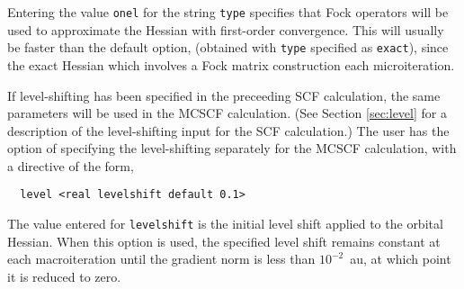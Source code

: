 Entering the value \verb+onel+ for the string \verb+type+ specifies
that Fock operators will be used to
approximate the Hessian with first-order convergence. This will usually
be faster than the default option, (obtained with \verb+type+ specified 
as \verb+exact+), since the exact Hessian which involves a Fock matrix
construction each microiteration. 

If level-shifting has been specified in the preceeding SCF calculation,
the same parameters will be used in the MCSCF calculation.  (See Section
\ref{sec:level} for a description of the level-shifting input for
the SCF calculation.)  The user has the option of specifying the level-shifting
separately for the MCSCF calculation, with a directive of the form,

\begin{verbatim}
  level <real levelshift default 0.1>
\end{verbatim}

The value entered for \verb+levelshift+ is the initial level shift applied 
to the orbital Hessian. 
When this option is used, the specified level shift
remains constant at each macroiteration until the gradient norm is
less than $10^{-2}$~au, at which point it is reduced to zero.




